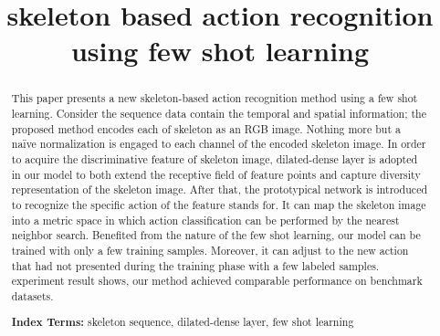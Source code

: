 \documentclass{bmvc2k}
\title{skeleton based action recognition\\ using few shot learning}
\begin{document}
\maketitle

\begin{abstract}
This paper presents a new skeleton-based action recognition method using a few shot learning. Consider the sequence data contain the temporal and spatial information; the proposed method encodes each of skeleton as an RGB image. Nothing more but a naïve normalization is engaged to each channel of the encoded skeleton image. In order to acquire the discriminative feature of skeleton image, dilated-dense layer is adopted in our model to both extend the receptive field of feature points and capture diversity representation of the skeleton image. After that, the prototypical network is introduced to recognize the specific action of the feature stands for. It can map the skeleton image into a metric space in which action classification can be performed by the nearest neighbor search. Benefited from the nature of the few shot learning, our model can be trained with only a few training samples. Moreover, it can adjust to the new action that had not presented during the training phase with a few labeled samples. experiment result shows, our method achieved comparable performance on benchmark datasets.

\textbf{Index Terms:} skeleton sequence, dilated-dense layer, few shot learning
\end{abstract}

\end{document}
